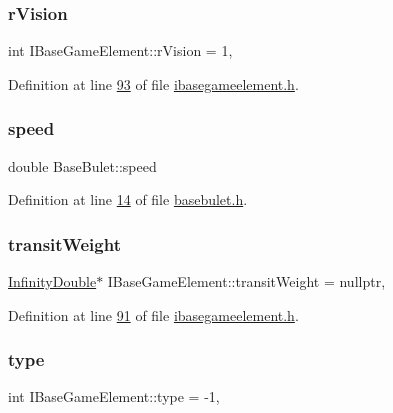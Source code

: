 \subsubsection{\texorpdfstring{r\+Vision}{rVision}}
{\footnotesize\ttfamily int I\+Base\+Game\+Element\+::r\+Vision = 1\hspace{0.3cm}{\ttfamily [protected]}, {\ttfamily [inherited]}}



Definition at line \hyperlink{a00047_source_l00093}{93} of file \hyperlink{a00047_source}{ibasegameelement.\+h}.

\mbox{\label{a00153_ad90bbbab47b5e3b8fa1a683210d026d7}} 
\subsubsection{\texorpdfstring{speed}{speed}}
{\footnotesize\ttfamily double Base\+Bulet\+::speed\hspace{0.3cm}{\ttfamily [protected]}}



Definition at line \hyperlink{a00035_source_l00014}{14} of file \hyperlink{a00035_source}{basebulet.\+h}.

\mbox{\label{a00137_a865c937433f7d46665ca17e5adccd9df}} 
\subsubsection{\texorpdfstring{transit\+Weight}{transitWeight}}
{\footnotesize\ttfamily \hyperlink{a00161}{Infinity\+Double}$\ast$ I\+Base\+Game\+Element\+::transit\+Weight = nullptr\hspace{0.3cm}{\ttfamily [protected]}, {\ttfamily [inherited]}}



Definition at line \hyperlink{a00047_source_l00091}{91} of file \hyperlink{a00047_source}{ibasegameelement.\+h}.

\mbox{\label{a00137_a73a4ca23072b617f3d17004e3c671bca}} 
\subsubsection{\texorpdfstring{type}{type}}
{\footnotesize\ttfamily int I\+Base\+Game\+Element\+::type = -\/1\hspace{0.3cm}{\ttfamily [protected]}, {\ttfamily [inherited]}}



